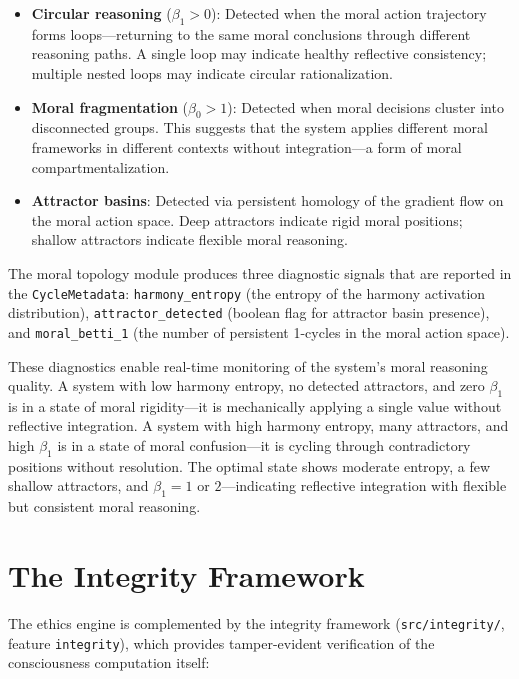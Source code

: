 \documentclass[12pt]{book}
\begin{document}
\begin{itemize}
  \item \textbf{Circular reasoning} ($\beta_1 > 0$): Detected when the moral action trajectory forms loops---returning to the same moral conclusions through different reasoning paths. A single loop may indicate healthy reflective consistency; multiple nested loops may indicate circular rationalization.
  \item \textbf{Moral fragmentation} ($\beta_0 > 1$): Detected when moral decisions cluster into disconnected groups. This suggests that the system applies different moral frameworks in different contexts without integration---a form of moral compartmentalization.
  \item \textbf{Attractor basins}: Detected via persistent homology of the gradient flow on the moral action space. Deep attractors indicate rigid moral positions; shallow attractors indicate flexible moral reasoning.
\end{itemize}

The moral topology module produces three diagnostic signals that are reported in the \texttt{CycleMetadata}: \texttt{harmony\_entropy} (the entropy of the harmony activation distribution), \texttt{attractor\_detected} (boolean flag for attractor basin presence), and \texttt{moral\_betti\_1} (the number of persistent 1-cycles in the moral action space).

These diagnostics enable real-time monitoring of the system's moral reasoning quality. A system with low harmony entropy, no detected attractors, and zero $\beta_1$ is in a state of moral rigidity---it is mechanically applying a single value without reflective integration. A system with high harmony entropy, many attractors, and high $\beta_1$ is in a state of moral confusion---it is cycling through contradictory positions without resolution. The optimal state shows moderate entropy, a few shallow attractors, and $\beta_1 = 1$ or $2$---indicating reflective integration with flexible but consistent moral reasoning.

\section{The Integrity Framework}

The ethics engine is complemented by the integrity framework (\texttt{src/integrity/}, feature \texttt{integrity}), which provides tamper-evident verification of the consciousness computation itself:
\end{document}
